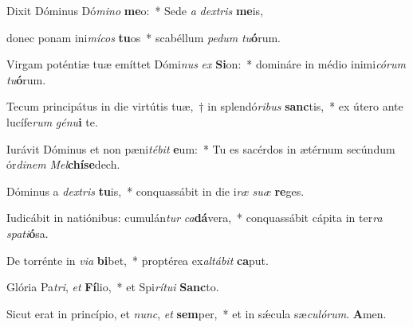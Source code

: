 \item Dixit Dóminus Dó\textit{mi}\textit{no} \textbf{me}o:~* Sede \textit{a} \textit{dex}\textit{tris} \textbf{me}is,

\item donec ponam ini\textit{mí}\textit{cos} \textbf{tu}os~* scabéllum \textit{pe}\textit{dum} \textit{tu}\textbf{ó}rum.

\item Virgam poténtiæ tuæ emíttet Dómi\textit{nus} \textit{ex} \textbf{Si}on:~* domináre in médio inimi\textit{có}\textit{rum} \textit{tu}\textbf{ó}rum.

\item Tecum principátus in die virtútis tuæ,~† in splendó\textit{ri}\textit{bus} \textbf{sanc}tis,~* ex útero ante lucífe\textit{rum} \textit{gé}\textit{nu}\textbf{i} te.

\item Iurávit Dóminus et non pæni\textit{té}\textit{bit} \textbf{e}um:~* Tu es sacérdos in ætérnum secúndum ór\textit{di}\textit{nem} \textit{Mel}\textbf{chí}\textbf{se}dech.

\item Dóminus a \textit{dex}\textit{tris} \textbf{tu}is,~* conquassábit in die i\textit{ræ} \textit{su}\textit{æ} \textbf{re}ges.

\item Iudicábit in natiónibus: cumulán\textit{tur} \textit{ca}\textbf{dá}vera,~* conquassábit cápita in ter\textit{ra} \textit{spa}\textit{ti}\textbf{ó}sa.

\item De torrénte in \textit{vi}\textit{a} \textbf{bi}bet,~* proptérea ex\textit{al}\textit{tá}\textit{bit} \textbf{ca}put.

\item Glória Pa\textit{tri}, \textit{et} \textbf{Fí}lio,~* et Spi\textit{rí}\textit{tu}\textit{i} \textbf{Sanc}to.

\item Sicut erat in princípio, et \textit{nunc}, \textit{et} \textbf{sem}per,~* et in sǽcula sæ\textit{cu}\textit{ló}\textit{rum}. \textbf{A}men.